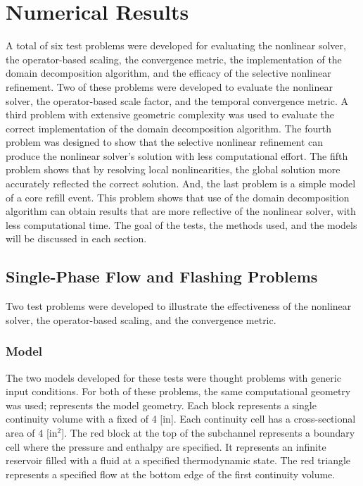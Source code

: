 \chapter{Numerical Results}
\label{chap:results}

A total of six test problems were developed for evaluating the nonlinear solver, the operator-based scaling, the convergence metric, the implementation of the domain decomposition algorithm, and the efficacy of the selective nonlinear refinement.
Two of these problems were developed to evaluate the nonlinear solver, the operator-based scale factor, and the temporal convergence metric.
A third problem with extensive geometric complexity was used to evaluate the correct implementation of the domain decomposition algorithm.
The fourth problem was designed to show that the selective nonlinear refinement can produce the nonlinear solver's solution with less computational effort.
The fifth problem shows that by resolving local nonlinearities, the global solution more accurately reflected the correct solution.
And, the last problem is a simple model of a core refill event.
This problem shows that use of the domain decomposition algorithm can obtain results that are more reflective of the nonlinear solver, with less computational time.
The goal of the tests, the methods used, and the models will be discussed in each section.

\section{Single-Phase Flow and Flashing Problems}
\label{sect:single_phase_and_flashing}

Two test problems were developed to illustrate the effectiveness of the nonlinear solver, the operator-based scaling, and the convergence metric.

\subsection{Model}
\label{subsect:single_model}
The two models developed for these tests were thought problems with generic input conditions.
For both of these problems, the same computational geometry was used;   represents the model geometry.
Each block represents a single continuity volume with a fixed \dx{} of 4 [in].
Each continuity cell has a cross-sectional area of 4 [in$^2$].
The red block at the top of the subchannel represents a boundary cell where the pressure and enthalpy are specified.
It represents an infinite reservoir filled with a fluid at a specified thermodynamic state.
The red triangle represents a specified flow at the bottom edge of the first continuity volume. 

